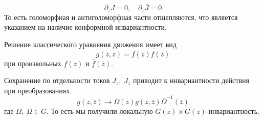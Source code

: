 \documentclass[a4paper,12pt]{article}
\theoremstyle{definition} \newtheorem{Def}{Definition}
\begin{document}
\begin{equation}
  \label{eq:100}
  \partial_{\bar z}J=0,\quad \partial_z \bar J=0
\end{equation}
То есть голоморфная и антиголоморфная части отщепляются, что является указанием на наличие
конформной инвариантности.

Решение классического уравнения движения имеет вид
\begin{equation}
  \label{eq:80}
  g(z,\bar z)=f(z)\bar f(\bar z)
\end{equation}
при произвольных $f(z)$ и $\bar f (\bar z)$.

Сохранение по отдельности токов $J_z,\; J_{\bar z}$ приводит к инвариантности действия при преобразованиях
\begin{equation}
  \label{eq:81}
   g(z,\bar z)\to \Omega(z)g(z,\bar z)\bar \Omega^{-1}(\bar z)
\end{equation}
где $\Omega,\;\bar \Omega \in G$. То есть мы получили локальную $G(z)\times G(\bar z)$-инвариантность.
\end{document}
